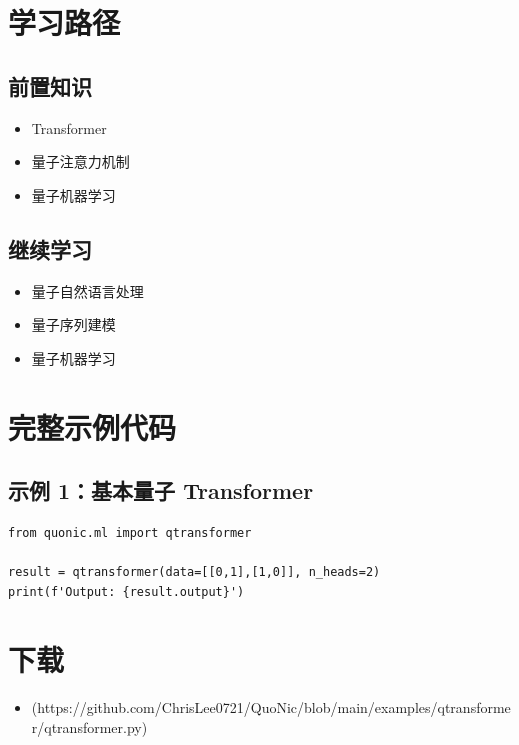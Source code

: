 \documentclass[12pt,a4paper]{article}
\begin{document}
\section{学习路径}

\subsection{前置知识}
\begin{itemize}
  \item Transformer
  \item 量子注意力机制
  \item 量子机器学习
\end{itemize}

\subsection{继续学习}
\begin{itemize}
  \item 量子自然语言处理
  \item 量子序列建模
  \item 量子机器学习
\end{itemize}

\section{完整示例代码}

\subsection{示例 1：基本量子 Transformer}

\begin{verbatim}
from quonic.ml import qtransformer

result = qtransformer(data=[[0,1],[1,0]], n_heads=2)
print(f'Output: {result.output}')
\end{verbatim}

\section{下载}

\begin{itemize}
  \item [qtransformer.py](https://github.com/ChrisLee0721/QuoNic/blob/main/examples/qtransformer/qtransformer.py)
\end{itemize}
\end{document}
